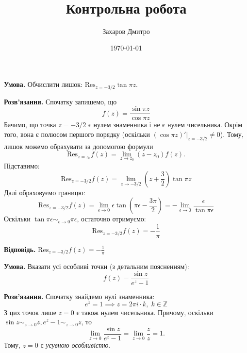 \documentclass[oneside,solution]{karazin-complan-assign}
\title{Контрольна робота}
\author{Захаров Дмитро}
\date{\today}
\begin{document}
\maketitle


\problem{}

\hspace{20px}\textbf{Умова.} Обчислити лишок: $\text{Res}_{z=-3/2}\tan \pi z$.

\textbf{Розв'язання.} Спочатку запишемо, що
\begin{equation}
    f(z) = \frac{\sin \pi z}{\cos \pi z}
\end{equation}
Бачимо, що точка $z=-3/2$ є нулем знаменника і не є нулем чисельника. Окрім того, вона є полюсом першого порядку (оскільки $(\cos \pi z)'\Big|_{z=-3/2}\neq 0$). Тому, лишок можемо обрахувати за допомогою формули 
\begin{equation}
    \text{Res}_{z=z_0}f(z)=\lim_{z \to z_0}(z-z_0)f(z).
\end{equation}
Підставимо:
\begin{equation}
    \text{Res}_{z=-3/2}f(z) = \lim_{z \to -3/2} \left(z+\frac{3}{2}\right)\tan \pi z
\end{equation}
Далі обраховуємо границю:
\begin{equation}
    \text{Res}_{z=-3/2}f(z) = \lim_{\epsilon \to 0} \epsilon \tan \left(\pi \epsilon - \frac{3\pi}{2}\right) = -\lim_{\epsilon \to 0} \frac{\epsilon}{\tan \pi \epsilon}
\end{equation}
Оскільки $\tan \pi \epsilon \sim_{\epsilon \to 0} \pi \epsilon$, остаточно отримуємо:
\begin{equation}
    \boxed{\text{Res}_{z=-3/2}f(z) = -\frac{1}{\pi}}
\end{equation} 

\textbf{Відповідь.} $\text{Res}_{z=-3/2}f(z) = -\frac{1}{\pi}$

\problem{}

\hspace{20px}\textbf{Умова.} Вказати усі особливі точки (з детальним поясненням):
\begin{equation}
    f(z) = \frac{\sin z}{e^z-1}
\end{equation}

\textbf{Розв'язання.} Спочатку знайдемо нулі знаменника:
\begin{equation}
    e^z = 1 \implies z = 2\pi i \cdot k, \; k \in \mathbb{Z}
\end{equation}
З цих точок лише $z=0$ є також нулем чисельника. Причому, оскільки $\sin z \sim_{z \to 0} z, e^{z}-1 \sim_{z \to 0}z$, то
\begin{equation}
    \lim_{z \to 0} \frac{\sin z}{e^{z}-1} = \lim_{z \to 0} \frac{z}{z} = 1.
\end{equation}
Тому, $z=0$ є \textit{усувною особливістю}. 
\end{document}
